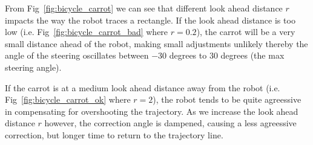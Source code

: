 \documentclass{article}
\begin{document}
From Fig~\ref{fig:bicycle_carrot} we can see that different look ahead distance $r$ impacts the way the robot traces a rectangle. If the look ahead distance is too low (i.e. Fig~\ref{fig:bicycle_carrot_bad} where $r = 0.2$), the carrot will be a very small distance ahead of the robot, making small adjustments unlikely thereby the angle of the steering oscillates between $-30$ degrees to $30$ degrees (the max steering angle).

If the carrot is at a medium look ahead distance away from the robot  (i.e. Fig~\ref{fig:bicycle_carrot_ok} where $r = 2$), the robot tends to be quite agreessive in compensating for overshooting the trajectory. As we increase the look ahead distance $r$ however, the correction angle is dampened, causing a less agreessive correction, but longer time to return to the trajectory line.
\end{document}

